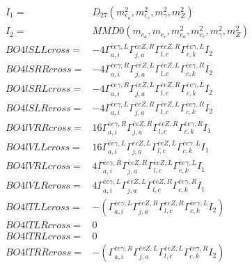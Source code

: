 \documentclass[A4,landscape]{article}
\begin{document}
\begin{align} 
I_1 = & D_{27}(m^2_{e_{{a}}}, m^2_{e_{{c}}}, m^2_{\gamma}, m^2_{Z}) \\ 
I_2 = & MMD0(m_{e_{{a}}}, m_{e_{{c}}}, m^2_{e_{{a}}}, m^2_{e_{{c}}}, m^2_{\gamma}, m^2_{Z}) \\ 
  BO4lSLLcross= & -4  \Gamma^{\bar{e}e \gamma ,L}_{a, i} \Gamma^{\bar{e}e Z ,R}_{j, a} \Gamma^{\bar{e}e Z ,R}_{l, c} \Gamma^{\bar{e}e \gamma ,L}_{c, k} I_2 \\ 
  BO4lSRRcross= & -4  \Gamma^{\bar{e}e \gamma ,R}_{a, i} \Gamma^{\bar{e}e Z ,L}_{j, a} \Gamma^{\bar{e}e Z ,L}_{l, c} \Gamma^{\bar{e}e \gamma ,R}_{c, k} I_2 \\ 
  BO4lSRLcross= & -4  \Gamma^{\bar{e}e \gamma ,R}_{a, i} \Gamma^{\bar{e}e Z ,L}_{j, a} \Gamma^{\bar{e}e Z ,R}_{l, c} \Gamma^{\bar{e}e \gamma ,L}_{c, k} I_2 \\ 
  BO4lSLRcross= & -4  \Gamma^{\bar{e}e \gamma ,L}_{a, i} \Gamma^{\bar{e}e Z ,R}_{j, a} \Gamma^{\bar{e}e Z ,L}_{l, c} \Gamma^{\bar{e}e \gamma ,R}_{c, k} I_2 \\ 
  BO4lVRRcross= & 16  \Gamma^{\bar{e}e \gamma ,R}_{a, i} \Gamma^{\bar{e}e Z ,R}_{j, a} \Gamma^{\bar{e}e Z ,R}_{l, c} \Gamma^{\bar{e}e \gamma ,R}_{c, k} I_1 \\ 
  BO4lVLLcross= & 16  \Gamma^{\bar{e}e \gamma ,L}_{a, i} \Gamma^{\bar{e}e Z ,L}_{j, a} \Gamma^{\bar{e}e Z ,L}_{l, c} \Gamma^{\bar{e}e \gamma ,L}_{c, k} I_1 \\ 
  BO4lVRLcross= & 4  \Gamma^{\bar{e}e \gamma ,R}_{a, i} \Gamma^{\bar{e}e Z ,R}_{j, a} \Gamma^{\bar{e}e Z ,L}_{l, c} \Gamma^{\bar{e}e \gamma ,L}_{c, k} I_1 \\ 
  BO4lVLRcross= & 4  \Gamma^{\bar{e}e \gamma ,L}_{a, i} \Gamma^{\bar{e}e Z ,L}_{j, a} \Gamma^{\bar{e}e Z ,R}_{l, c} \Gamma^{\bar{e}e \gamma ,R}_{c, k} I_1 \\ 
  BO4lTLLcross= & -( \Gamma^{\bar{e}e \gamma ,L}_{a, i} \Gamma^{\bar{e}e Z ,R}_{j, a} \Gamma^{\bar{e}e Z ,R}_{l, c} \Gamma^{\bar{e}e \gamma ,L}_{c, k} I_2) \\ 
  BO4lTLRcross= & 0 \\ 
  BO4lTRLcross= & 0 \\ 
  BO4lTRRcross= & -( \Gamma^{\bar{e}e \gamma ,R}_{a, i} \Gamma^{\bar{e}e Z ,L}_{j, a} \Gamma^{\bar{e}e Z ,L}_{l, c} \Gamma^{\bar{e}e \gamma ,R}_{c, k} I_2) \\ 
\end{align} 
\end{document}
